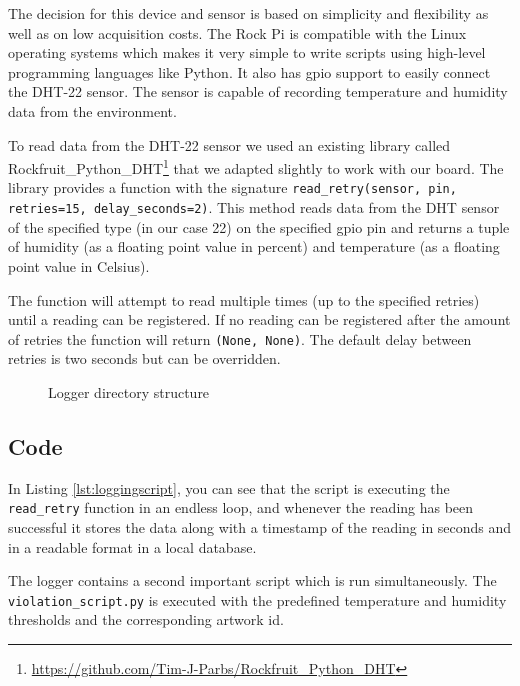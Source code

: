 The decision for this device and sensor is based on simplicity and flexibility as well as on low acquisition costs. The Rock Pi is compatible with the Linux operating systems which makes it very simple to write scripts using high-level programming languages like Python. It also has \gls{gpio} support to easily connect the DHT-22 sensor. The sensor is capable of recording temperature and humidity data from the environment.

To read data from the DHT-22 sensor we used an existing library called Rockfruit\_Python\_DHT\footnote{\href{https://github.com/Tim-J-Parbs/Rockfruit_Python_DHT}{https://github.com/Tim-J-Parbs/Rockfruit\_Python\_DHT}} that we adapted slightly to work with our board. The library provides a function with the signature \texttt{read\_retry(sensor, pin, retries=15, delay\_seconds=2)}. This method reads data from the DHT sensor of the specified type (in our case 22) on the specified \gls{gpio} pin and returns a tuple of humidity (as a floating point value in percent) and temperature (as a floating point value in Celsius). 

The function will attempt to read multiple times (up to the specified retries) until a reading can be registered. If no reading can be registered after the amount of retries the function will return \texttt{(None, None)}. The default delay between retries is two seconds but can be overridden.

\begin{figure}[ht]
    \centering
        
    \caption{Logger directory structure}
    \label{fig:artis-logger-filetree}
\end{figure}

\subsection{Code}


In Listing \ref{lst:loggingscript}, you can see that the script is executing the \texttt{read\_retry} function in an endless loop, and whenever the reading has been successful it stores the data along with a timestamp of the reading in seconds and in a readable format in a local database.

The logger contains a second important script which is run simultaneously. The \texttt{violation\_script.py} is executed with the predefined temperature and humidity thresholds and the corresponding artwork \gls{id}.


